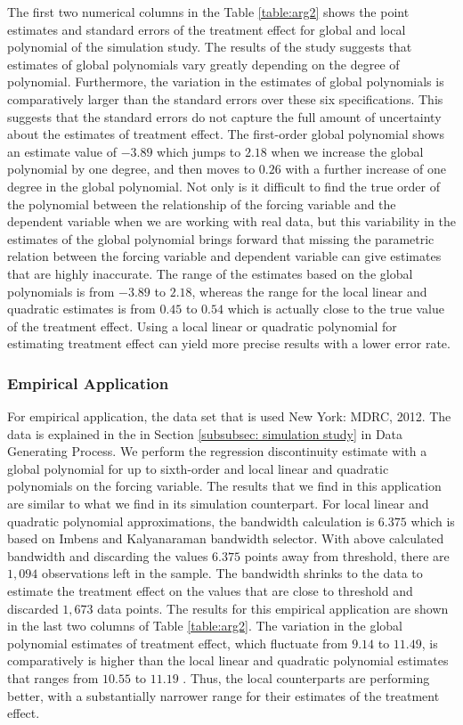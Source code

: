\documentclass[fleqn]{article}
\begin{document}
    The first two numerical columns in the Table \ref{table:arg2} shows the point estimates and standard errors of the treatment effect for global and local polynomial of the simulation study. The results of the study suggests that estimates of global polynomials vary greatly depending on the degree of polynomial. Furthermore, the variation in the estimates of global polynomials is comparatively larger than the standard errors over these six specifications. This suggests that the standard errors do not capture the full amount of uncertainty about the estimates of treatment effect. The first-order global polynomial shows an estimate value of $-3.89$ which jumps to $2.18$ when we increase the global polynomial by one degree, and then moves to $0.26$ with a further increase of one degree in the global polynomial. Not only is it difficult to find the true order of the polynomial between the relationship of the forcing variable and the dependent variable when we are working with real data, but this variability in the estimates of the global polynomial brings forward that missing the parametric relation between the forcing variable and dependent variable can give estimates that are highly inaccurate. The range of the estimates based on the global polynomials is from $-3.89$ to $2.18$, whereas the range for the local linear and quadratic estimates is from $0.45$ to $0.54$ which is actually close to the true value of the treatment effect. Using a local linear or quadratic polynomial for estimating treatment effect can yield more precise results with a lower error rate.

    \subsubsection{Empirical Application}
    \label{subsubsec: arg2 emp app}

    For empirical application, the data set that is used New York: MDRC, 2012\cite{jacob2012practical}. The data is explained in the in Section \ref{subsubsec: simulation study} in Data Generating Process. We perform the regression discontinuity estimate with a global polynomial for up to sixth-order and local linear and quadratic polynomials on the forcing variable. The results that we find in this application are similar to what we find in its simulation counterpart. For local linear and quadratic polynomial approximations, the bandwidth calculation is $6.375$ which is based on Imbens and Kalyanaraman bandwidth selector\cite{imbens2012optimal}. With above calculated bandwidth and discarding the values $6.375$ points away from threshold, there are $1,094$ observations left in the sample. The bandwidth shrinks to the data to estimate the treatment effect on the values that are close to threshold and discarded $1,673$ data points. The results for this empirical application are shown in the last two columns of Table \ref{table:arg2}. The variation in the global polynomial estimates of treatment effect, which fluctuate from $9.14$ to $11.49$, is comparatively is higher than the local linear and quadratic polynomial estimates that ranges from $10.55$ to $11.19$ . Thus, the local counterparts are performing better, with a substantially narrower range for their estimates of the treatment effect.
\end{document}
